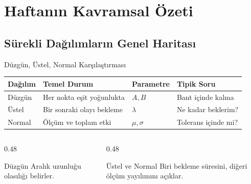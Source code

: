 \documentclass[light]{lutbeamer}
\begin{document}
\section{Haftanın Kavramsal Özeti}
\subsection{Sürekli Dağılımların Genel Haritası}

\begin{frame}{Düzgün, Üstel, Normal Karşılaştırması}
\small
\centering
\renewcommand{\arraystretch}{1.3}
\begin{tabular}{@{}llll@{}}
    \toprule
    \textbf{Dağılım} & \textbf{Temel Durum} & \textbf{Parametre} & \textbf{Tipik Soru} \\ \midrule
    Düzgün & Her nokta eşit yoğunlukta & $A,B$ & Bant içinde kalma \\
    Üstel & Bir sonraki olayı bekleme & $\lambda$ & Ne kadar beklerim? \\
    Normal & Ölçüm ve toplam etki & $\mu,\sigma$ & Tolerans içinde mi? \\ \bottomrule
\end{tabular}

\vspace{0.25cm}
\begin{columns}[T,onlytextwidth]
    \begin{column}{0.48\textwidth}
        \begin{block}{Düzgün}
            Aralık uzunluğu olasılığı belirler.
        \end{block}
    \end{column}
    \begin{column}{0.48\textwidth}
        \begin{block}{Üstel ve Normal}
            Biri bekleme süresini, diğeri ölçüm yayılımını açıklar.
        \end{block}
    \end{column}
\end{columns}
\end{frame}
\end{document}

